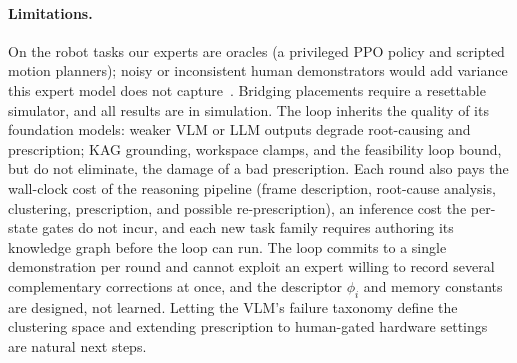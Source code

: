 \documentclass[letterpaper]{article} %
\begin{document}
\paragraph{Limitations.}
On the robot tasks our experts are oracles (a privileged PPO policy and
scripted motion planners); noisy or inconsistent human demonstrators would
add variance this expert model does not
capture~\citep{mandlekar2020iwr,liu2023sirius}. Bridging placements require
a resettable simulator, and all results are in simulation. The loop inherits
the quality of its foundation models: weaker VLM or LLM outputs degrade
root-causing and prescription; KAG grounding, workspace clamps, and the
feasibility loop bound, but do not eliminate, the damage of a bad
prescription. Each round also pays the
wall-clock cost of the reasoning pipeline (frame description, root-cause
analysis, clustering, prescription, and possible re-prescription), an
inference cost the per-state gates do not incur, and each new task family
requires authoring its knowledge graph before the loop can run. The loop
commits to a single demonstration per round and cannot exploit an expert
willing to record several complementary corrections at once, and the
descriptor $\phi_i$ and memory constants are designed, not learned. Letting
the VLM's failure taxonomy define the clustering space and extending
prescription to human-gated hardware
settings~\citep{kelly2019hgdagger} are natural next steps.



\end{document}
